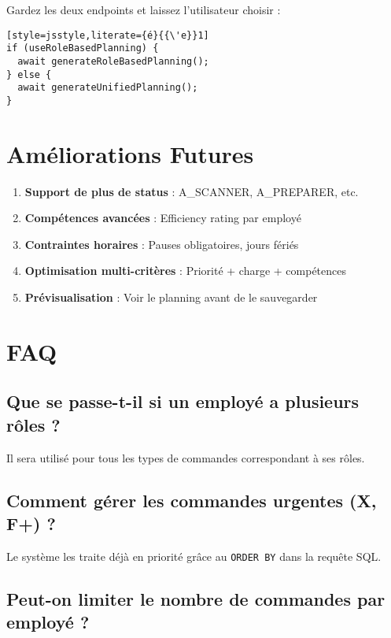 \documentclass[11pt,a4paper]{article}
\begin{document}
    Gardez les deux endpoints et laissez l'utilisateur choisir :

    \begin{lstlisting}[style=jsstyle,literate={é}{{\'e}}1]
if (useRoleBasedPlanning) {
  await generateRoleBasedPlanning();
} else {
  await generateUnifiedPlanning();
}
    \end{lstlisting}

    \section{Améliorations Futures}

    \begin{enumerate}
        \item \textbf{Support de plus de status} : A\_SCANNER, A\_PREPARER, etc.
        \item \textbf{Compétences avancées} : Efficiency rating par employé
        \item \textbf{Contraintes horaires} : Pauses obligatoires, jours fériés
        \item \textbf{Optimisation multi-critères} : Priorité + charge + compétences
        \item \textbf{Prévisualisation} : Voir le planning avant de le sauvegarder
    \end{enumerate}

    \section{FAQ}

    \subsection{Que se passe-t-il si un employé a plusieurs rôles ?}

    Il sera utilisé pour tous les types de commandes correspondant à ses rôles.

    \subsection{Comment gérer les commandes urgentes (X, F+) ?}

    Le système les traite déjà en priorité grâce au \texttt{ORDER BY} dans la requête SQL.

    \subsection{Peut-on limiter le nombre de commandes par employé ?}
\end{document}

